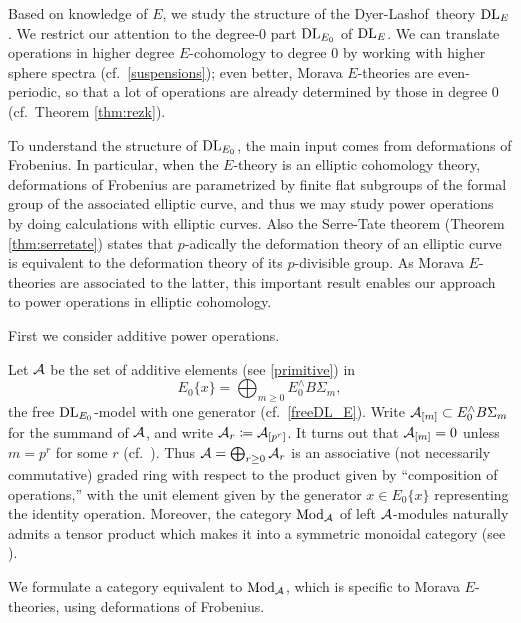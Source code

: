 \documentclass{gtpart}
\theoremstyle{definition}
\theoremstyle{remark}
\newcommand{\CA}{{\cal A}}
\newcommand{\Mod}{{\rm Mod}}
\newcommand{\dl}{{\rm DL}}
\newcommand{\DL}{Dyer-Lashof~}
\newcommand{\ce}{\coloneqq}
\numberwithin{equation}{section}
\numberwithin{thm}{section}
\begin{document}
Based on knowledge of $E$, we study the structure of the \DL theory 
$\dl_E$.  We restrict our attention to the degree-0 part $\dl_{E_0}$ of 
$\dl_E$.  We can translate operations in higher degree $E$-cohomology to 
degree 0 by working with higher sphere spectra (cf.~\eqref{suspensions}); 
even better, Morava $E$-theories are even-periodic, so that a lot of 
operations are already determined by those in degree 0 (cf.~Theorem 
\ref{thm:rezk}).  

To understand the structure of $\dl_{E_0}$, the main input comes from 
deformations of Frobenius.  In particular, when the $E$-theory is an 
elliptic cohomology theory, deformations of Frobenius are parametrized 
by finite flat subgroups of the formal group of the associated elliptic 
curve, and thus we may study power operations by doing calculations with 
elliptic curves.  Also the Serre-Tate theorem (Theorem 
\ref{thm:serretate}) states that $p$-adically the deformation theory of 
an elliptic curve is equivalent to the deformation theory of its 
$p$-divisible group.  As Morava $E$-theories are associated to the 
latter, this important result enables our approach to power operations 
in elliptic cohomology.  

First we consider additive power operations.  

Let $\CA$ be the set of additive elements (see \eqref{primitive}) in 
\[
 E_0\{x\} = \bigoplus_{m \geq 0} E_0^\wedge B\Sigma_m, 
\]
the free $\dl_{E_0}$-model with one generator (cf.~\eqref{freeDL_E}).  
Write $\CA_{[m]} \subset E_0^\wedge B\Sigma_m$ for the summand of $\CA$, 
and write $\CA_r \ce \CA_{[p^r]}$.  It turns out that $\CA_{[m]} = 0$ 
unless $m = p^r$ for some $r$ (cf.~\cite[Lemma 8.10]{Str98}).  Thus 
$\CA = \bigoplus_{r \geq 0} \CA_r$ is an associative (not necessarily 
commutative) graded ring with respect to the product given by 
``composition of operations,'' with the unit element given by the 
generator $x \in E_0\{x\}$ representing the identity operation.  
Moreover, the category $\Mod_\CA$ of left $\CA$-modules naturally admits 
a tensor product which makes it into a symmetric monoidal category (see 
\cite[Proposition 7.6]{lpo}).  

We formulate a category equivalent to $\Mod_\CA$, which is specific to 
Morava $E$-theories, using deformations of Frobenius.  
\end{document}
